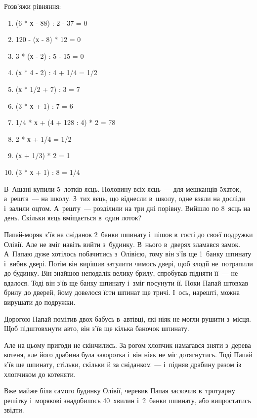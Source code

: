 \problem
Розв’яжи рівняння:
\begin{multicols}{2}
    \begin{enumerate}
        \item (6 * х - 88) : 2 - 37 = 0
        \item 120 - (х - 8) * 12 = 0
        \item 3 * (х - 2) : 5 - 15 = 0
        \item (х * 4 - 2) : 4 + 1/4 = 1/2
        \item (х * 1/2 + 7) : 3 = 7
        \item (3 * х + 1) : 7 = 6
        \item 1/4 * х + (4 + 128 : 4) * 2 = 78
        \item 2 * х + 1/4 = 1/2 
        \item (х + 1/3) * 2 = 1
        \item (3 * х + 1) : 8 = 1/4
    \end{enumerate}
\end{multicols}


\problem
В~Ашані купили 5~лотків яєць.
Половину всіх яєць~--- для мешканців 5хаток, а~решта~--- на школу.
З~тих яєць, що віднесли в~школу, одне взяли на досліди і~залили оцтом.
А~решту~--- розділили на три дні порівну. Вийшло по 8~яєць на день.
Скільки яєць вміщається в~один лоток? 


\problem
Папай-моряк з’їв на сніданок 2~банки шпинату і~пішов в~гості до своєї
подружки Олівії. Але не зміг навіть вийти з~будинку. В~нього в~дверях
зламався замок. А~Папаю дуже хотілось побачитись з~Олівією, тому він
з’їв ще 1~банку шпинату і~вибив двері. Потім він вирішив затулити
чимось двері, щоб злодії не~потрапили до будинку. Він знайшов неподалік
велику брилу, спробував підняти її~--- не вдалося. Тоді він з’їв ще банку
шпинату і~зміг посунути її. Поки Папай штовхав брилу до дверей, йому
довелося їсти шпинат ще тричі. І~ось, нарешті, можна вирушати до подружки.

Дорогою Папай помітив двох бабусь в~автівці, які ніяк не могли рушити
з~місця. Щоб підштовхнути авто, він з’їв ще кілька баночок шпинату.

Але на цьому пригоди не скінчились. За рогом хлопчик намагався зняти
з~дерева котеня, але його драбина була закоротка і~він ніяк не міг
дотягнутись. Тоді Папай з’їв ще шпинату, стільки, скільки й
за сніданком~--- і~підняв драбину разом із хлопчиком до котеняти.

Вже майже біля самого будинку Олівії, черевик Папая заскочив в~тротуарну
решітку і~морякові знадобилось 40~хвилин і~2~банки шпинату,
або випростатись звідти.

